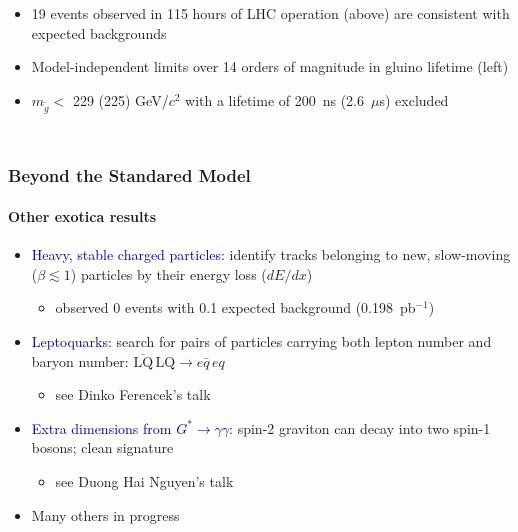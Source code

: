 \documentclass[compress]{beamer}
\begin{document}
\begin{frame}
\begin{columns}
\begin{itemize}
\item 19 events observed in 115 hours of LHC operation (above) are
  consistent with expected backgrounds

\item Model-independent limits over 14 orders of magnitude in gluino
  lifetime (left)

\item $m_{\tilde{g}} <$ 229 (225) GeV/$c^2$ with a lifetime of 200~ns
  (2.6~$\mu$s) excluded
\end{itemize}
\end{columns}
\end{frame}

\begin{frame}
\frametitle{Beyond the Standared Model}
\framesubtitle{Other exotica results}
\begin{itemize}\setlength{\itemsep}{0.3 cm}
\item \textcolor{darkblue}{Heavy, stable charged particles:} identify
  tracks belonging to new, slow-moving ($\beta \lesssim 1$) particles
  by their energy loss ($dE/dx$)
\begin{itemize}
\item observed 0 events with 0.1 expected background (0.198~pb$^{-1}$)
\end{itemize}

\item \textcolor{darkblue}{Leptoquarks:} search for pairs of particles
  carrying both lepton number and baryon number: $\overline{\mbox{LQ}}\,\mbox{LQ} \to e\bar{q}\,eq$
\begin{itemize}
\item see Dinko Ferencek's talk
\end{itemize}

\item \textcolor{darkblue}{Extra dimensions from $G^* \to
  \gamma\gamma$:} spin-2 graviton can decay into two spin-1 bosons;
  clean signature
\begin{itemize}
\item see Duong Hai Nguyen's talk
\end{itemize}

\item Many others in progress
\end{itemize}
\end{frame}
\end{document}

